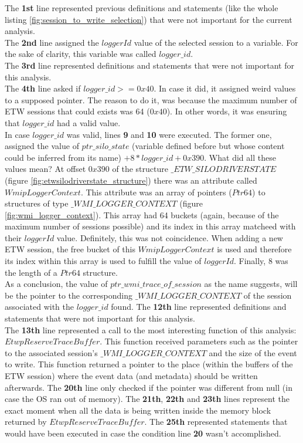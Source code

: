 The {\bfseries 1st} line represented previous definitions and statements (like the whole listing \ref{fig:session_to_write_selection}) that were not important for the current analysis. \\
The {\bfseries 2nd} line assigned the $loggerId$ value of the selected session to a variable. For the sake of clarity, this variable was called $logger\_id$.\\
The {\bfseries 3rd} line represented definitions and statements that were not important for this analysis.\\
The {\bfseries 4th} line asked if $logger\_id >= 0x40$. In case it did, it assigned weird values to a supposed pointer. The reason to do it, was because the maximum number of ETW sessions that could exists was 64 ($0x40$). In other words, it was ensuring that $logger\_id$ had a valid value. \\
In case $logger\_id$ was valid, lines {\bfseries 9} and {\bfseries 10} were executed. The former one, assigned the value of $ptr\_silo\_state$ (variable defined before but whose content could be inferred from its name) $+ 8 * logger\_id + 0x390$. What did all these values mean? 
At offset $0x390$ of the structure $\_ETW\_SILODRIVERSTATE$ (figure \ref{fig:etwsilodriverstate_structure}) there was an attribute called $WmipLoggerContext$. This attribute was an array of pointers ($Ptr64$) to structures of type $\_WMI\_LOGGER\_CONTEXT$ (figure \ref{fig:wmi_logger_context}). This array had 64 buckets (again, because of the maximum number of sessions possible) and its index in this array matcheed with their $loggerId$ value. Definitely, this was not coincidence. When adding a new ETW session, the free bucket of this $WmipLoggerContext$ is used and therefore its index within this array is used to fulfill the value of $loggerId$. Finally, $8$ was the length of a $Ptr64$ structure. \\
As a conclusion, the value of $ptr\_wmi\_trace\_of\_session$ as the name suggests, will be the pointer to the corresponding $\_WMI\_LOGGER\_CONTEXT$ of the session associated with the $logger\_id$ found. 
The {\bfseries 12th} line represented definitions and statements that were not important for this analysis.\\
The {\bfseries 13th} line represented a call to the most interesting function of this analysis: $EtwpReserveTraceBuffer$. This function received parameters such as the pointer to the associated session's $\_WMI\_LOGGER\_CONTEXT$ and the size of the event to write. This function returned a pointer to the place (within the buffers of the ETW session) where the event data (and metadata) should be written afterwards. 
The {\bfseries 20th} line only checked if the pointer was different from null (in case the OS ran out of memory). 
The {\bfseries 21th}, {\bfseries 22th} and {\bfseries 23th} lines represent the exact moment when all the data is being written inside the memory block returned by $EtwpReserveTraceBuffer$.
The {\bfseries 25th} represented statements that would have been executed in case the condition line {\bfseries 20} wasn't accomplished.

